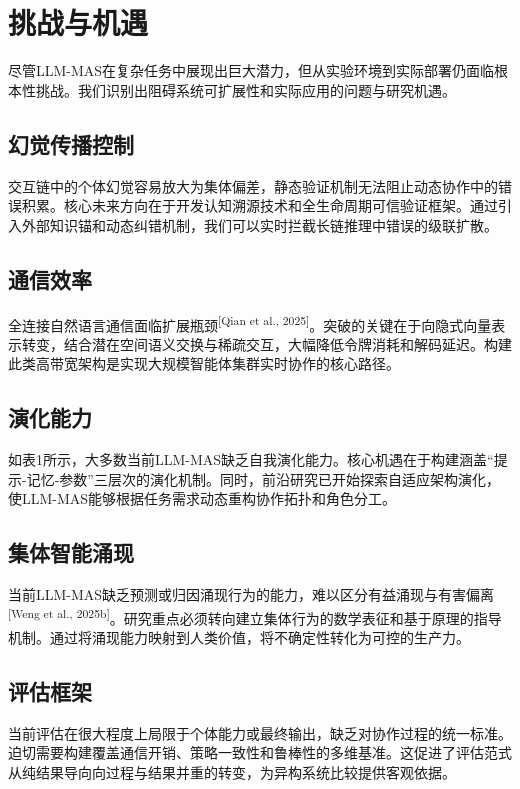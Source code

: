 \documentclass[UTF8,a4paper,12pt]{article}
\begin{document}
\newpage
\section{挑战与机遇}

尽管LLM-MAS在复杂任务中展现出巨大潜力，但从实验环境到实际部署仍面临根本性挑战。我们识别出阻碍系统可扩展性和实际应用的问题与研究机遇。

\subsection{幻觉传播控制}

交互链中的个体幻觉容易放大为集体偏差，静态验证机制无法阻止动态协作中的错误积累。核心未来方向在于开发认知溯源技术和全生命周期可信验证框架。通过引入外部知识锚和动态纠错机制，我们可以实时拦截长链推理中错误的级联扩散。

\subsection{通信效率}

全连接自然语言通信面临扩展瓶颈\textsuperscript{[Qian et al., 2025]}。突破的关键在于向隐式向量表示转变，结合潜在空间语义交换与稀疏交互，大幅降低令牌消耗和解码延迟。构建此类高带宽架构是实现大规模智能体集群实时协作的核心路径。

\subsection{演化能力}

如表1所示，大多数当前LLM-MAS缺乏自我演化能力。核心机遇在于构建涵盖``提示-记忆-参数''三层次的演化机制。同时，前沿研究已开始探索自适应架构演化，使LLM-MAS能够根据任务需求动态重构协作拓扑和角色分工。

\subsection{集体智能涌现}

当前LLM-MAS缺乏预测或归因涌现行为的能力，难以区分有益涌现与有害偏离\textsuperscript{[Weng et al., 2025b]}。研究重点必须转向建立集体行为的数学表征和基于原理的指导机制。通过将涌现能力映射到人类价值，将不确定性转化为可控的生产力。

\subsection{评估框架}

当前评估在很大程度上局限于个体能力或最终输出，缺乏对协作过程的统一标准。迫切需要构建覆盖通信开销、策略一致性和鲁棒性的多维基准。这促进了评估范式从纯结果导向向过程与结果并重的转变，为异构系统比较提供客观依据。
\end{document}
